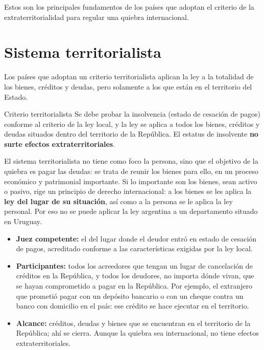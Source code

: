 \documentclass[12pt,oneside]{book}
\begin{document}
Estos son los principales fundamentos de los países que adoptan el criterio de la extraterritorialidad para regular una quiebra internacional.

\section{Sistema territorialista}

Los países que adoptan un criterio territorialista aplican la ley a la totalidad de los bienes, créditos y deudas, pero solamente a los que están en el territorio del Estado.

\begin{definition}{Criterio territorialista}
Se debe probar la insolvencia (estado de cesación de pagos) conforme al criterio de la ley local, y la ley se aplica a todos los bienes, créditos y deudas situados dentro del territorio de la República. El estatus de insolvente \textbf{no surte efectos extraterritoriales}.
\end{definition}

El sistema territorialista no tiene como foco la persona, sino que el objetivo de la quiebra es pagar las deudas: se trata de reunir los bienes para ello, en un proceso económico y patrimonial importante. Si lo importante son los bienes, sean activo o pasivo, rige un principio de derecho internacional: a los bienes se les aplica la \textbf{ley del lugar de su situación}, así como a la persona se le aplica la ley personal. Por eso no se puede aplicar la ley argentina a un departamento situado en Uruguay.

\begin{itemize}
    \item \textbf{Juez competente:} el del lugar donde el deudor entró en estado de cesación de pagos, acreditado conforme a las características exigidas por la ley local.
    \item \textbf{Participantes:} todos los acreedores que tengan un lugar de cancelación de créditos en la República, y todos los deudores, no importa dónde vivan, que se hayan comprometido a pagar en la República. Por ejemplo, el extranjero que prometió pagar con un depósito bancario o con un cheque contra un banco con domicilio en el país: ese crédito se hace ejecutar en el territorio.
    \item \textbf{Alcance:} créditos, deudas y bienes que se encuentran en el territorio de la República; ahí se cierra. Aunque la quiebra sea internacional, no tiene efectos extraterritoriales.
\end{itemize}
\end{document}
